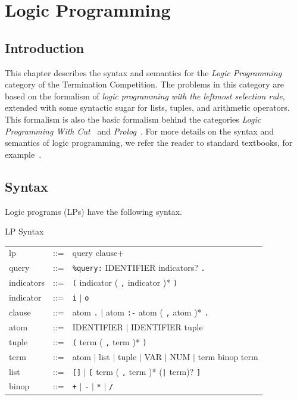 \newcommand{\plcode}[1]{%
  \raisebox{-0.15ex}{\tt\textquotesingle}\texttt{{#1}}%
  \raisebox{-0.15ex}{\tt\textquotesingle}%
}
\newcommand{\pldot}{\plcode{.}}
\newcommand{\plcomma}{\plcode{,}}
\newcommand{\ie}{\textit{i.e.}, }

\chapter{Logic Programming}\label{chap:LP}

\section{Introduction}

This chapter describes the syntax and semantics for the
\emph{Logic Programming} category of the Termination Competition.
The problems in this category are based on the formalism of
\emph{logic programming with the leftmost selection rule},
extended with some syntactic sugar for lists, tuples, and 
arithmetic operators.
This formalism is also the basic formalism behind the categories
\emph{Logic Programming With Cut}~\cite{Schneider-KampGSST10}
and \emph{Prolog}~\cite{Deransart96,ISO-Prolog95}.
%
For more details on the syntax and semantics of logic programming,
we refer the reader to standard textbooks, for example~\cite{Apt97,Lloyd87}.

\section{Syntax}

Logic programs (LPs) have the following syntax.

\begin{grammar}{LP Syntax}
  \begin{tabular}{lll}
  lp & ::= & query clause+ \\
  query & ::= & {\color{red}\verb+%query:+} IDENTIFIER indicators? {\color{red}\verb+.+} \\
  indicators & ::= & {\color{red}\verb+(+} indicator ( {\color{red}\verb+,+} indicator )* {\color{red}\verb+)+}\\
  indicator & ::= & {\color{red}\verb+i+} $|$ {\color{red}\verb+o+} \\
  clause & ::= & atom {\color{red}\verb+.+} $|$
  atom {\color{red}\verb+:-+} atom ( {\color{red}\verb+,+} atom )* {\color{red}\verb+.+} \\
  atom & ::= & IDENTIFIER $|$ IDENTIFIER tuple \\
  tuple & ::= & {\color{red}\verb+(+} term ( {\color{red}\verb+,+} term )* {\color{red}\verb+)+} \\
  term & ::= & atom $|$ list $|$ tuple $|$ VAR $|$ NUM $|$ term binop term \\
  list & ::= & {\color{red}\verb+[]+} $|$
  {\color{red}\verb+[+} term ( {\color{red}\verb+,+} term )* 
  ({\color{red}\verb+|+} term)? {\color{red}\verb+]+} \\
  binop & ::= & {\color{red}\verb-+-} $|$ {\color{red}\verb+-+} $|$ {\color{red}\verb+*+} $|$ {\color{red}\verb+/+} \\
  \end{tabular}
\end{grammar}

